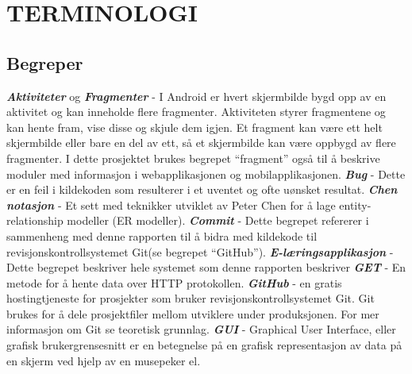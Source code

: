 \documentclass[../main.tex]{subfiles}
\begin{document}
\chapter*{TERMINOLOGI}

\section*{Begreper}
\newline
\textbf{\textit{Aktiviteter}} og \textbf{\textit{Fragmenter}} - I Android er hvert skjermbilde bygd opp av en aktivitet og kan inneholde flere fragmenter. Aktiviteten styrer fragmentene og kan hente fram, vise disse og skjule dem igjen. Et fragment kan være ett helt skjermbilde eller bare en del av ett, så et skjermbilde kan være oppbygd av flere fragmenter.  I dette prosjektet brukes begrepet “fragment” også til å beskrive moduler med informasjon i webapplikasjonen og mobilapplikasjonen. \newline
\newline
\textbf{\textit{Bug}} - Dette er en feil i kildekoden som resulterer i et uventet og ofte uønsket resultat.\newline
\newline
\textbf{\textit{Chen notasjon}} - Et sett med teknikker utviklet av Peter Chen for å lage entity-relationship modeller (ER modeller). \newline
\newline
\textbf{\textit{Commit}} - Dette begrepet refererer i sammenheng med denne rapporten til å bidra med kildekode til revisjonskontrollsystemet Git(se begrepet “GitHub”).\newline
\newline
\textbf{\textit{E-læringsapplikasjon}} - Dette begrepet beskriver hele systemet som denne rapporten beskriver\newline
\newline
\textbf{\textit{GET}} - En metode for å hente data over HTTP protokollen.  \newline
\newline
\textbf{\textit{GitHub}} - en gratis hostingtjeneste for prosjekter som bruker revisjonskontrollsystemet Git. Git brukes for å dele prosjektfiler mellom utviklere under produksjonen. For mer informasjon om Git se teoretisk grunnlag.\newline
\newline
\textbf{\textit{GUI}} - Graphical User Interface, eller grafisk brukergrensesnitt er en betegnelse på en grafisk representasjon av data på en skjerm ved hjelp av en musepeker el.\newline
\end{document}
